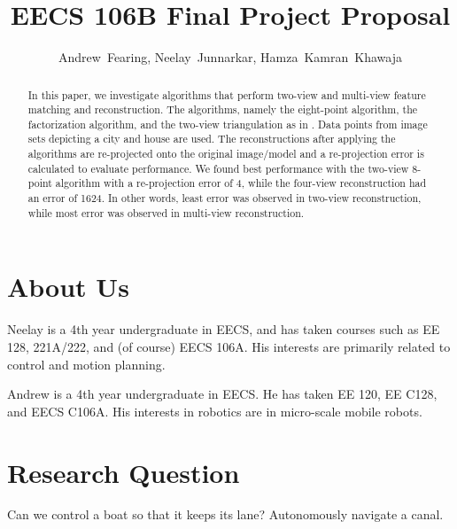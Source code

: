 \documentclass[journal]{IEEEtran}
\begin{document}
\title{EECS 106B Final Project Proposal}
\author{Andrew~Fearing, Neelay~Junnarkar,  Hamza~Kamran~Khawaja}
\maketitle




\begin{abstract} In this paper, we investigate algorithms that perform two-view and multi-view feature matching and reconstruction. The algorithms, namely the eight-point algorithm, the factorization algorithm, and the two-view triangulation as in \cite{ma2012invitation}. Data points from image sets depicting a city and house are used. The reconstructions after applying the algorithms are re-projected onto the original image/model and a re-projection error is calculated to evaluate performance. We found best performance with the two-view 8-point algorithm with a re-projection error of 4, while the four-view reconstruction had an error of 1624. In other words, least error was observed in two-view reconstruction, while most error was observed in multi-view reconstruction.
\end{abstract}


\section{About Us}
Neelay is a 4th year undergraduate in EECS, and has taken courses such as EE 128, 221A/222, and (of course) EECS 106A. His interests are primarily related to control and motion planning.

Andrew is a 4th year undergraduate in EECS. He has taken EE 120, EE C128, and EECS C106A. His interests in robotics are in micro-scale mobile robots.
\section{Research Question}
Can we control a boat so that it keeps its lane? Autonomously navigate a canal.
\end{document}
